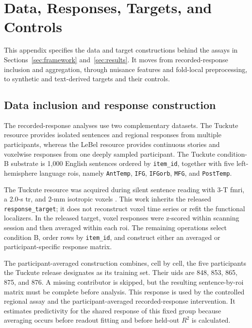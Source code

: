 \section{Data, Responses, Targets, and Controls}
\label{app:data-targets}

This appendix specifies the data and target constructions behind the assays in Sections~\ref{sec:framework} and~\ref{sec:results}.
It moves from recorded-response inclusion and aggregation, through nuisance features and fold-local preprocessing, to synthetic and text-derived targets and their controls.

\subsection{Data inclusion and response construction}

The recorded-response analyses use two complementary datasets.
The Tuckute resource provides isolated sentences and regional responses from multiple participants, whereas the LeBel resource provides continuous stories and voxelwise responses from one deeply sampled participant.
The Tuckute condition-B substrate is 1,000 English sentences ordered by \texttt{item\_id}, together with five left-hemisphere language \acp{roi}, namely \texttt{AntTemp}, \texttt{IFG}, \texttt{IFGorb}, \texttt{MFG}, and \texttt{PostTemp}. 

The Tuckute resource was acquired during silent sentence reading with 3-T \ac{fmri}, a 2.0-s \ac{tr}, and 2-mm isotropic voxels \autocite{tuckute2024}. 
This work inherits the released \texttt{response\_target}; it does not reconstruct voxel time series or refit the functional localizers.
In the released target, voxel responses were z-scored within scanning session and then averaged within each \ac{roi}.
The remaining operations select condition B, order rows by \texttt{item\_id}, and construct either an averaged or participant-specific response matrix. 

The participant-averaged construction combines, cell by cell, the five participants the Tuckute release designates as its training set.
Their \acp{uid} are 848, 853, 865, 875, and 876.
A missing contributor is skipped, but the resulting sentence-by-\ac{roi} matrix must be complete before analysis.
This response is used by the controlled regional assay and the participant-averaged recorded-response intervention.
It estimates predictivity for the shared response of this fixed group because averaging occurs before readout fitting and before held-out $R^2$ is calculated.

